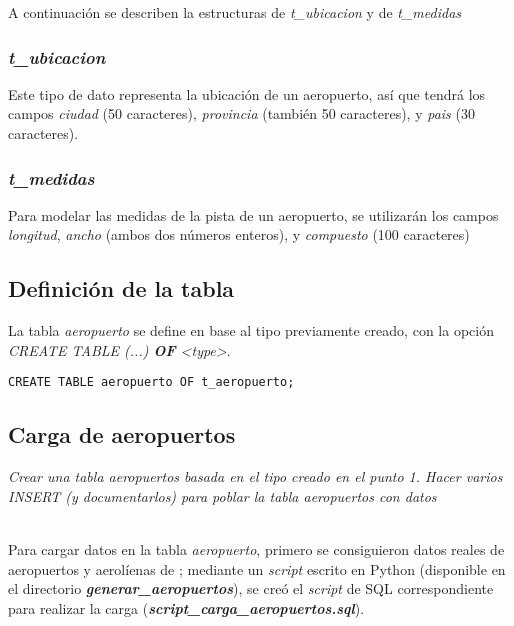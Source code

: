 A continuación se describen la estructuras de \emph{t\_ubicacion} y de \emph{t\_medidas}  

\subsubsection{\emph{t\_ubicacion}}

Este tipo de dato representa la ubicación de un aeropuerto, así que tendrá los campos \emph{ciudad} (50 caracteres), \emph{provincia} (también 50 caracteres), y \emph{pais} (30 caracteres). 

\subsubsection{\emph{t\_medidas}}

Para modelar las medidas de la pista de un aeropuerto, se utilizarán los campos \emph{longitud}, \emph{ancho} (ambos dos números enteros), y \emph{compuesto} (100 caracteres)  

\subsection{Definición de la tabla}

La tabla \emph{aeropuerto} se define en base al tipo previamente creado, con la opción \emph{CREATE TABLE (...) \textbf{OF} <type>}. 

\vspace*{5mm}
\lstset{style=sql}
\begin{lstlisting}
CREATE TABLE aeropuerto OF t_aeropuerto;
\end{lstlisting}

\subsection{Carga de aeropuertos}

\emph{Crear una tabla aeropuertos basada en el tipo creado en el punto 1. Hacer varios INSERT (y documentarlos) para poblar la tabla aeropuertos con datos} 

~\\

Para cargar datos en la tabla \emph{aeropuerto}, primero se consiguieron datos reales de aeropuertos y aerolíenas de \cite{datasets}; mediante un \emph{script} escrito en Python (disponible en el directorio \textbf{\emph{generar\_aeropuertos}}), se creó el \emph{script} de SQL correspondiente para realizar la carga (\textbf{\emph{script\_carga\_aeropuertos.sql}}).

